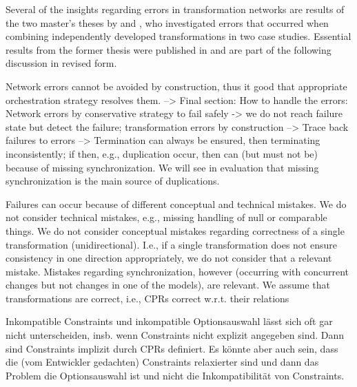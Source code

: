 Several of the insights regarding errors in transformation networks are results of the two master's theses by \textcite{syma2018ma} and \textcite{saglam2020ma}, who investigated errors that occurred when combining independently developed transformations in two case studies.
Essential results from the former thesis were published in  and are part of the following discussion in revised form.



Network errors cannot be avoided by construction, thus it good that appropriate orchestration strategy resolves them.
--> Final section: How to handle the errors: Network errors by conservative strategy to fail safely -> we do not reach failure state but detect the failure; transformation errors by construction
--> Trace back failures to errors
--> Termination can always be ensured, then terminating inconsistently; if then, e.g., duplication occur, then can (but must not be) because of missing synchronization. We will see in evaluation that missing synchronization is the main source of duplications.

Failures can occur because of different conceptual and technical mistakes.
We do not consider technical mistakes, e.g., missing handling of null or comparable things.
We do not consider conceptual mistakes regarding correctness of a single transformation (unidirectional). I.e., if a single transformation does not ensure consistency in one direction appropriately, we do not consider that a relevant mistake. Mistakes regarding synchronization, however (occurring with concurrent changes but not changes in one of the models), are relevant.
We assume that transformations are correct, i.e., CPRs correct w.r.t. their relations

Inkompatible Constraints und inkompatible Optionsauswahl lässt sich oft gar nicht unterscheiden, insb. wenn Constraints nicht explizit angegeben sind. Dann sind Constraints implizit durch CPRs definiert. Es könnte aber auch sein, dass die (vom Entwickler gedachten) Constraints relaxierter sind und dann das Problem die Optionsauswahl ist und nicht die Inkompatibilität von Constraints.

